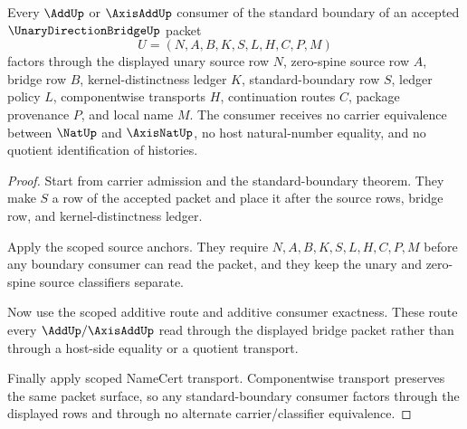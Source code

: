 \begin{theorem}
\label{thm:unary-direction-bridge-standard-boundary-consumer-factorization}
Every $\AddUp$ or $\AxisAddUp$ consumer of the standard boundary of an accepted $\UnaryDirectionBridgeUp$ packet
$$
U=(N,A,B,K,S,L,H,C,P,M)
$$
factors through the displayed unary source row $N$, zero-spine source row $A$, bridge row $B$, kernel-distinctness ledger $K$, standard-boundary row $S$, ledger policy $L$, componentwise transports $H$, continuation routes $C$, package provenance $P$, and local name $M$. The consumer receives no carrier equivalence between $\NatUp$ and $\AxisNatUp$, no host natural-number equality, and no quotient identification of histories.
\end{theorem}
\begin{proof}
Start from carrier admission and the standard-boundary theorem. They make $S$ a row of the accepted packet and place it after the source rows, bridge row, and kernel-distinctness ledger.

Apply the scoped source anchors. They require $N,A,B,K,S,L,H,C,P,M$ before any boundary consumer can read the packet, and they keep the unary and zero-spine source classifiers separate.

Now use the scoped additive route and additive consumer exactness. These route every $\AddUp/\AxisAddUp$ read through the displayed bridge packet rather than through a host-side equality or a quotient transport.

Finally apply scoped NameCert transport. Componentwise transport preserves the same packet surface, so any standard-boundary consumer factors through the displayed rows and through no alternate carrier/classifier equivalence.
\end{proof}

